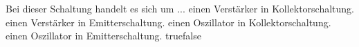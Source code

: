     {Bei dieser Schaltung handelt es sich um ...}
    {einen Verstärker in Kollektorschaltung.}
    {einen Verstärker in Emitterschaltung.}
    {einen Oszillator in Kollektorschaltung.}
    {einen Oszillator in Emitterschaltung.}
    {true}{false}